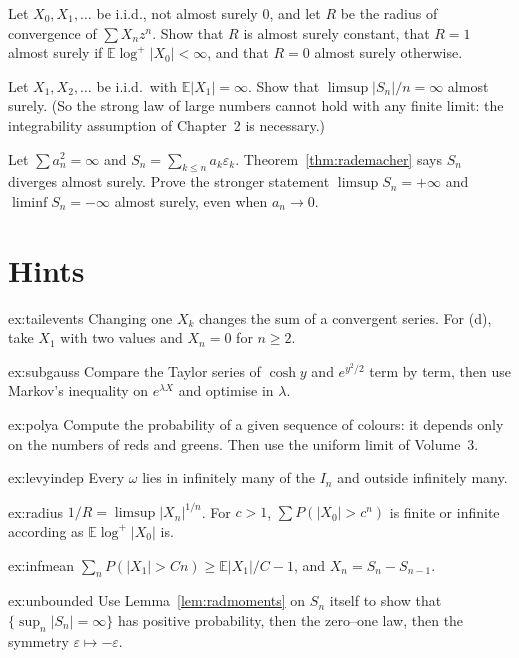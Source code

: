 \begin{exercise}[$\star\star$]\label{ex:radius}
Let $X_0,X_1,\dots$ be i.i.d., not almost surely $0$, and let $R$ be the radius of convergence of $\sum X_nz^n$. Show that $R$ is almost surely
constant, that $R=1$ almost surely if $\mathbb E\log^+|X_0|<\infty$, and that $R=0$ almost surely otherwise.
\end{exercise}

\begin{exercise}[$\star\star$]\label{ex:infmean}
Let $X_1,X_2,\dots$ be i.i.d.\ with $\mathbb E|X_1|=\infty$. Show that $\limsup|S_n|/n=\infty$ almost surely. (So the strong law of large
numbers cannot hold with any finite limit: the integrability assumption of Chapter~2 is necessary.)
\end{exercise}

\begin{exercise}[$\star\star\star$]\label{ex:unbounded}
Let $\sum a_n^2=\infty$ and $S_n=\sum_{k\le n}a_k\varepsilon_k$. Theorem~\ref{thm:rademacher} says $S_n$ diverges almost surely. Prove the
stronger statement $\limsup S_n=+\infty$ and $\liminf S_n=-\infty$ almost surely, even when $a_n\to0$.
\end{exercise}

\section{Hints}

\begin{hint}{ex:tailevents}
Changing one $X_k$ changes the sum of a convergent series. For (d), take $X_1$ with two values and $X_n=0$ for $n\ge2$.
\end{hint}
\begin{hint}{ex:subgauss}
Compare the Taylor series of $\cosh y$ and $e^{y^2/2}$ term by term, then use Markov's inequality on $e^{\lambda X}$ and optimise in $\lambda$.
\end{hint}
\begin{hint}{ex:polya}
Compute the probability of a given sequence of colours: it depends only on the numbers of reds and greens. Then use the uniform limit of
Volume~3.
\end{hint}
\begin{hint}{ex:levyindep}
Every $\omega$ lies in infinitely many of the $I_n$ and outside infinitely many.
\end{hint}
\begin{hint}{ex:radius}
$1/R=\limsup|X_n|^{1/n}$. For $c>1$, $\sum P(|X_0|>c^n)$ is finite or infinite according as $\mathbb E\log^+|X_0|$ is.
\end{hint}
\begin{hint}{ex:infmean}
$\sum_nP(|X_1|>Cn)\ge\mathbb E|X_1|/C-1$, and $X_n=S_n-S_{n-1}$.
\end{hint}
\begin{hint}{ex:unbounded}
Use Lemma~\ref{lem:radmoments} on $S_n$ itself to show that $\{\sup_n|S_n|=\infty\}$ has positive probability, then the zero--one law, then
the symmetry $\varepsilon\mapsto-\varepsilon$.
\end{hint}

